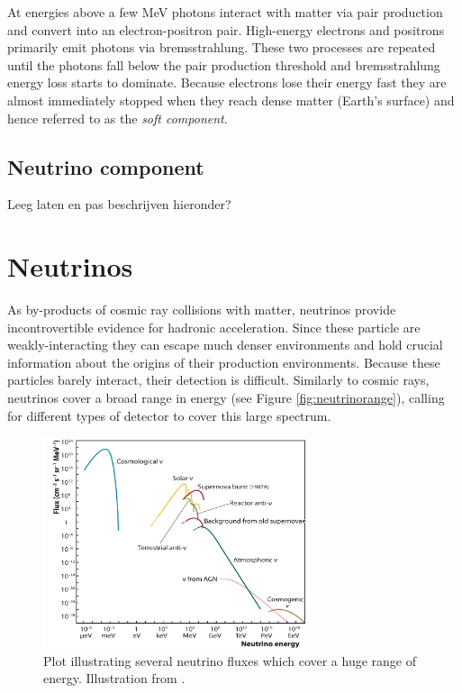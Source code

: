 At energies above a few MeV photons interact with matter via pair production and convert into an electron-positron pair. High-energy electrons and positrons primarily emit photons via bremsstrahlung. These two processes are repeated until the photons fall below the pair production threshold and bremsstrahlung energy loss starts to dominate. Because electrons lose their energy fast they are almost immediately stopped when they reach dense matter (Earth's surface) and hence referred to as the \textit{soft component}.
\subsection{Neutrino component}
Leeg laten en pas beschrijven hieronder?



\section{Neutrinos}
\label{sec:neutrinos}
As by-products of cosmic ray collisions with matter, neutrinos provide incontrovertible evidence for hadronic acceleration. Since these particle are weakly-interacting they can escape much denser environments and hold crucial information about the origins of their production environments. Because these particles barely interact, their detection is difficult. Similarly to cosmic rays, neutrinos cover a broad range in energy (see Figure \ref{fig:neutrinorange}), calling for different types of detector to cover this large spectrum. 

\begin{figure}[t]
\centering
\includegraphics[width=0.7\textwidth]{chapter3/img/neutrinospectrum.png}
\caption{Plot illustrating several neutrino fluxes which cover a huge range of energy. Illustration from \cite{Katz:2011ke}.}
\label{fig:neutrinospectrumall}
\end{figure}

